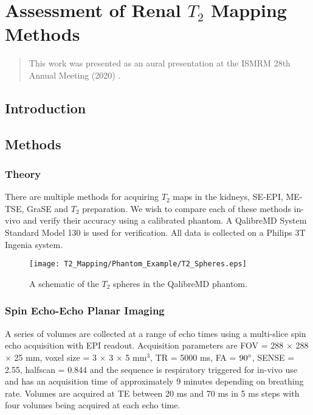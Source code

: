 \chapter{Assessment of Renal $T_2$ Mapping Methods}
\label{chap:t2_mapping}

\begin{abstract}
	This work was presented as an aural presentation at the \ac{ISMRM} 28th Annual Meeting (2020) \cite{daniel_comparison_2020}.\\
	\lipsum[1]
\end{abstract}
\newpage

\section{Introduction}
\label{sec:t2_intro}



\section{Methods}
\label{sec:t2_methods}

\subsection{Theory}

There are multiple methods for acquiring $T_2$ maps in the kidneys, \ac{SE}-\ac{EPI}, \ac{ME-TSE}, \ac{GraSE} and $T_2$ preparation. We wish to compare each of these methods in-vivo and verify their accuracy using a calibrated phantom. A QalibreMD System Standard Model 130 \cite{noauthor_system_nodate} is used for verification. All data is collected on a Philips 3T Ingenia system. 

\begin{figure}[H]
	\centering
	\texttt{[image: T2\_Mapping/Phantom\_Example/T2\_Spheres.eps]}
	\caption{A schematic of the $T_2$ spheres in the QalibreMD phantom.}
	\label{fig:t2_phantom_schematic}	
\end{figure}

\subsection{Spin Echo-Echo Planar Imaging}
A series of volumes are collected at a range of echo times using a multi-slice spin echo acquisition with \ac{EPI} readout. Acquisition parameters are \ac{FOV} = 288 $\times$ 288 $\times$ 25 mm, voxel size = 3 $\times$ 3 $\times$ 5 mm$^3$, \ac{TR} = 5000 ms, \ac{FA} = $90\degree$, \ac{SENSE} = 2.55, halfscan = 0.844 and the sequence is respiratory triggered for in-vivo use and has an acquisition time of approximately 9 minutes depending on breathing rate. Volumes are acquired at \ac{TE} between 20 ms and 70 ms in 5 ms steps with four volumes being acquired at each echo time. 


